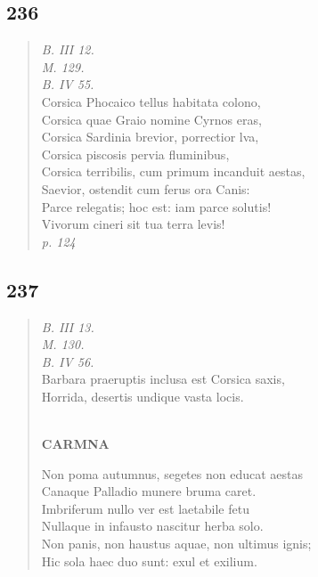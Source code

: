 \documentclass[11pt, a4paper]{report}
\begin{document}
            \subsection*{236}
      \begin{verse}
      \textit{B. III 12.} \\ \textit{M. 129.} \\ \textit{B. IV 55.} \\ Corsica Phocaico tellus habitata colono, \\ Corsica quae Graio nomine Cyrnos eras, \\ Corsica Sardinia brevior, porrectior lva, \\ Corsica piscosis pervia fluminibus, \\ Corsica terribilis, cum primum incanduit aestas, \\ Saevior, ostendit cum ferus ora Canis: \\ Parce relegatis; hoc est: iam parce solutis! \\ Vivorum cineri sit tua terra levis! \\ \textit{p. 124} \\ 
      \end{verse}
  
            \subsection*{237}
      \begin{verse}
      \textit{B. III 13.} \\ \textit{M. 130.} \\ \textit{B. IV 56.} \\ Barbara praeruptis inclusa est Corsica saxis, \\ Horrida, desertis undique vasta locis. \\ 
        ﻿\pagebreak 
     \marginpar{[196]} \begin{center} \textbf{CARMNA} \end{center}Non poma autumnus, segetes non educat aestas \\ Canaque Palladio munere bruma caret. \\ Imbriferum nullo ver est laetabile fetu \\ Nullaque in infausto nascitur herba solo. \\ Non panis, non haustus aquae, non ultimus ignis; \\ Hic sola haec duo sunt: exul et exilium. \\ 
      \end{verse}
  
\end{document}
